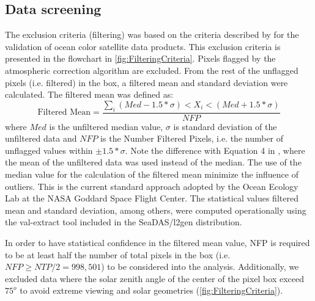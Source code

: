 \documentclass[onecolumn,3p,letterpaper,11pt]{elsarticle}
\begin{document}
\subsection{Data screening}
The exclusion criteria (filtering) was based on the criteria described by \citet{Bailey2006} for the validation of ocean color satellite data products. This exclusion criteria is presented in the flowchart in \autoref{fig:FilteringCriteria}. Pixels flagged by the atmospheric correction algorithm are excluded. From the rest of the unflagged pixels (i.e. filtered) in the box, a filtered mean and standard deviation were calculated. The filtered mean was defined as:
\begin{equation}\label{eq:filteredmean}
  \text{Filtered Mean} =\frac{\sum_i(Med-1.5*\sigma) <  X_i < (Med+1.5*\sigma)}{NFP}
\end{equation}
where $Med$ is the unfiltered median value, $\sigma$ is standard deviation of the unfiltered data and $NFP$ is the Number Filtered Pixels, i.e. the number of unflagged values within $\pm 1.5*\sigma$. Note the difference with Equation 4 in \citet{Bailey2006}, where the mean of the unfiltered data was used instead of the median. The use of the median value for the calculation of the filtered mean minimize the influence of outliers. This is the current standard approach adopted by the Ocean Ecology Lab at the NASA Goddard Space Flight Center. The statistical values filtered mean and standard deviation, among others, were computed operationally using the val-extract tool included in the SeaDAS/l2gen distribution.

In order to have statistical confidence in the filtered mean value, NFP is required to be at least half the number of total pixels in the box (i.e. $NFP\geq NTP/2 = 998,501$) to be considered into the analysis. Additionally, we excluded data where the solar zenith angle of the center of the pixel box exceed $75^o$ to avoid extreme viewing and solar geometries \citep{Bailey2006} (\autoref{fig:FilteringCriteria}).
\end{document}
